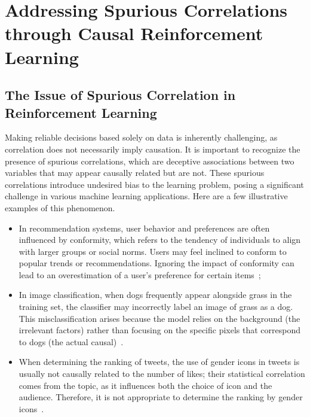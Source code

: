 \documentclass[10pt]{article} %
\theoremstyle{definition}
\begin{document}
%
%
\section{Addressing Spurious Correlations through Causal Reinforcement Learning}
\label{sec:4spurious}

\subsection{The Issue of Spurious Correlation in Reinforcement Learning}
Making reliable decisions based solely on data is inherently challenging, as correlation does not necessarily imply causation. It is important to recognize the presence of spurious correlations, which are deceptive associations between two variables that may appear causally related but are not. These spurious correlations introduce undesired bias to the learning problem, posing a significant challenge in various machine learning applications. Here are a few illustrative examples of this phenomenon.
\begin{itemize}
    \item In recommendation systems, user behavior and preferences are often influenced by conformity, which refers to the tendency of individuals to align with larger groups or social norms. Users may feel inclined to conform to popular trends or recommendations. Ignoring the impact of conformity can lead to an overestimation of a user's preference for certain items~\citep{gaoCausalInferenceRecommender2022a};
    \item In image classification, when dogs frequently appear alongside grass in the training set, the classifier may incorrectly label an image of grass as a dog. This misclassification arises because the model relies on the background  (the irrelevant factors) rather than focusing on the specific pixels that correspond to dogs (the actual causal)~\citep{zhangDeepStableLearning2021, wangCausalAttentionUnbiased2021}.
    \item When determining the ranking of tweets, the use of gender icons in tweets is usually not causally related to the number of likes; their statistical correlation comes from the topic, as it influences both the choice of icon and the audience. Therefore, it is not appropriate to determine the ranking by gender icons~\citep{federCausalInferenceNatural2022}.
\end{itemize}
\end{document}
